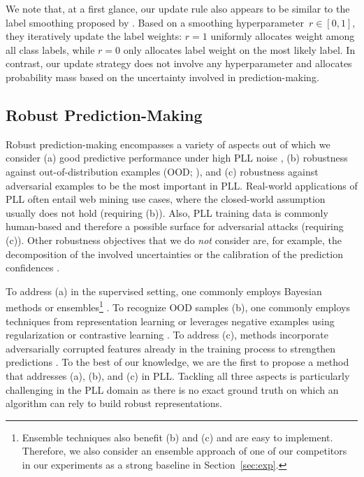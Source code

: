 We note that, at a first glance, our update rule also appears to be similar to the label smoothing proposed by \citet{GongB024}.
Based on a smoothing hyperparameter~$r \in [0, 1]$, they iteratively update the label weights: $r = 1$ uniformly allocates weight among all class labels, while $r = 0$ only allocates label weight on the most likely label.
In contrast, our update strategy does not involve any hyperparameter and allocates probability mass based on the uncertainty involved in prediction-making.

\subsection{Robust Prediction-Making}
Robust prediction-making encompasses a variety of aspects out of which we consider (a) good predictive performance under high PLL noise \citep{ZhangZW0021}, (b) robustness against out-of-distribution examples (OOD; \citealt{SensoyKK18}), and (c) robustness against adversarial examples \citep{MadryMSTV18} to be the most important in PLL.
Real-world applications of PLL often entail web mining use cases, where the closed-world assumption usually does not hold (requiring (b)).
Also, PLL training data is commonly human-based and therefore a possible surface for adversarial attacks (requiring (c)).
Other robustness objectives that we do \emph{not} consider are, for example, the decomposition of the involved uncertainties \citep{KendallG17,WimmerSHBH23} or the calibration of the prediction confidences \citep{AoRS23,MortierBHLW23}.

To address (a) in the supervised setting, one commonly employs Bayesian methods \citep{KingmaW13,KendallG17} or ensembles\footnote{Ensemble techniques also benefit (b) and (c) and are easy to implement. Therefore, we also consider an ensemble approach of one of our competitors in our experiments as a strong baseline in Section~\ref{sec:exp}.} \citep{Lakshminarayanan17,WimmerSHBH23}.
To recognize OOD samples (b), one commonly employs techniques from representation learning \citep{ZhangY15a,XuQGZ21} or leverages negative examples using regularization or contrastive learning \citep{SensoyKK18,WangXLF0CZ22}.
To address (c), methods incorporate adversarially corrupted features already in the training process to strengthen predictions \citep{Lakshminarayanan17}.
To the best of our knowledge, we are the first to propose a method that addresses (a), (b), and (c) in PLL.
Tackling all three aspects is particularly challenging in the PLL domain as there is no exact ground truth on which an algorithm can rely to build robust representations.